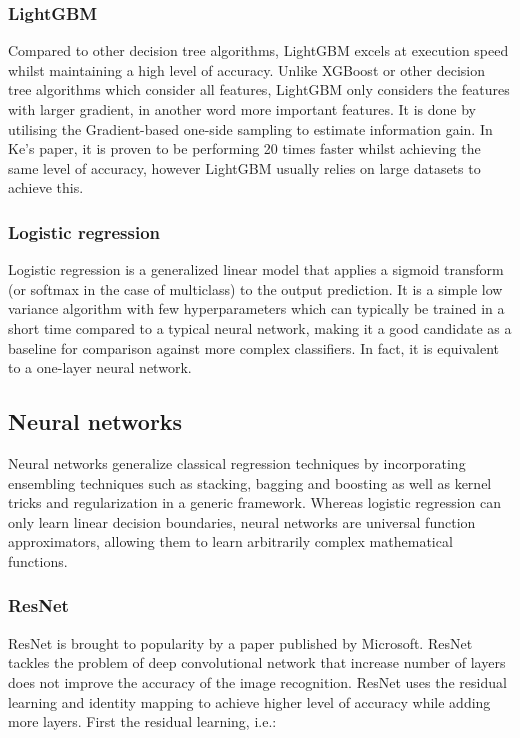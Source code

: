 \documentclass{article} %
\begin{document}
\subsubsection{LightGBM}
Compared to other decision tree algorithms, LightGBM excels at execution speed whilst maintaining a high level of accuracy. Unlike XGBoost or other decision tree algorithms which consider all features, LightGBM only considers the features with larger gradient, in another word more important features. It is done by utilising the Gradient-based one-side sampling to estimate information gain. In Ke’s paper, it is proven to be performing 20 times faster whilst achieving the same level of accuracy, however LightGBM usually relies on large datasets to achieve this. \cite{Dummy:6}

\subsubsection{Logistic regression}
Logistic regression is a generalized linear model that applies a sigmoid transform (or softmax in the case of multiclass) to the output prediction. \cite{lr} It is a simple low variance algorithm with few hyperparameters which can typically be trained in a short time compared to a typical neural network, making it a good candidate as a baseline for comparison against more complex classifiers. In fact, it is equivalent to a one-layer neural network.

\subsection{Neural networks}
Neural networks generalize classical regression techniques by incorporating ensembling techniques such as stacking, bagging and boosting as well as kernel tricks and regularization in a generic framework. Whereas logistic regression can only learn linear decision boundaries, neural networks are universal function approximators, allowing them to learn arbitrarily complex mathematical functions. \cite{nn}

\subsubsection{ResNet}
ResNet is brought to popularity by a paper published by Microsoft. ResNet tackles the problem of deep convolutional network that increase number of layers does not improve the accuracy of the image recognition. \cite{Dummy:3} ResNet uses the residual learning and identity mapping to achieve higher level of accuracy while adding more layers. First the residual learning, i.e.:
\end{document}
